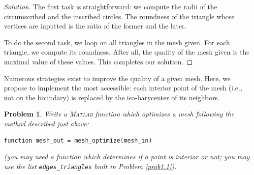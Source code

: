 \documentclass[11pt,a4paper,center,notitlepage]{article}
\numberwithin{equation}{section}
\newtheorem{prob}{Problem}[section]
\begin{document}
\begin{proof}[Solution]
The first task is straightforward: we compute the radii of the circumscribed and the inscribed circles. The roundness of the triangle whose vertices are inputted is the ratio of the former and the later.

To do the second task, we loop on all triangles in the mesh given. For each triangle, we compute its roundness. After all, the quality of the mesh given is the maximal value of these values. This completes our solution.
\end{proof}
Numerous strategies exist to improve the quality of a given mesh. Here, we propose to implement the most accessible: each interior point of the mesh (i.e., not on the boundary) is replaced by the iso-barycenter of its neighbors.

\begin{prob}
Write a \textsc{Matlab} function which optimizes a mesh following the method described just above:
\begin{verbatim}
function mesh_out = mesh_optimize(mesh_in)
\end{verbatim}
(you may need a function which determines if a point is interior or not; you may use the list \verb|edges_triangles| built in Problem \ref{prob1.1}).
\end{prob}
\end{document}

